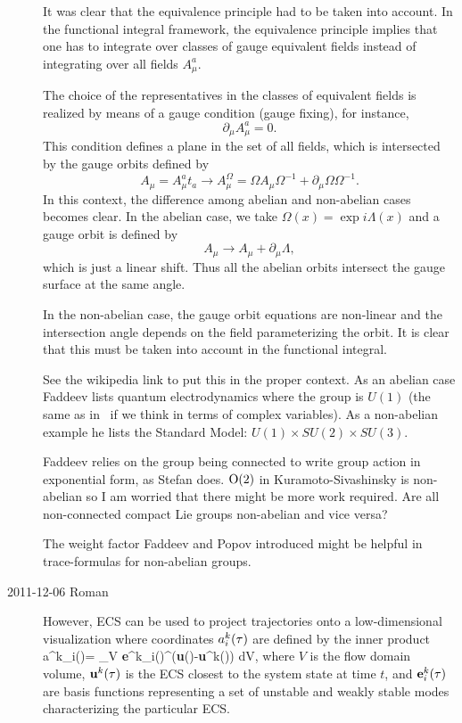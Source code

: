 \begin{description}
\begin{ttfamily}
It was clear that the equivalence principle had to be taken into account.
In the functional integral framework, the equivalence principle implies
that one has to integrate over classes of gauge equivalent fields instead
of integrating over all fields $A_\mu^a$.

The choice of the representatives in the classes of equivalent fields is
realized by means of a gauge condition (gauge fixing), for instance,
\[
    \partial_{\mu} A_{\mu}^{a} = 0 .
\]
This condition defines a plane in the set of all fields, which is
intersected by the gauge orbits defined by
\[
    A_{\mu} = A_{\mu}^{a}t_{a} \to A_{\mu}^{\Omega}
            = \Omega A_{\mu} \Omega^{-1} + \partial_{\mu} \Omega \Omega^{-1} .
\]
In this context, the difference among abelian and non-abelian cases
becomes clear. In the abelian case, we take $\Omega(x) =
\exp{i\Lambda(x)}$ and a gauge orbit is defined by
\[
    A_{\mu} \to A_{\mu} + \partial_{\mu} \Lambda ,
\]
which is just a linear shift. Thus all the abelian orbits intersect the
gauge surface at the same angle.

In the non-abelian case, the gauge orbit equations are non-linear and the
intersection angle depends on the field parameterizing the orbit. It is
clear that this must be taken into account in the functional integral.
\end{ttfamily}

See the wikipedia link to put this in the proper context. As an abelian
case Faddeev lists quantum electrodynamics where the group is $U(1)$ (the
same as in \cLe\ if we think in terms of complex variables). As a
non-abelian example he lists the Standard Model: $U(1)\times SU(2) \times
SU(3)$.

Faddeev relies on the group being connected to write group action in
exponential form, as Stefan does. $\textrm{O}(2)$ in Kuramoto-Sivashinsky is
non-abelian so I am worried that there might be more work required. Are
all non-connected compact Lie groups non-abelian and vice versa?

The weight factor Faddeev and Popov introduced might be helpful in
trace-formulas for non-abelian groups.

\item[2011-12-06 Roman] However,  ECS can be used to project
trajectories onto a low-dimensional visualization where coordinates $a^k_{i}(\tau)$
are defined by the inner product
\beq
\label{coordinatesRG}
a^k_{i}(\zeit)=  \int_V {\bf e}^k_i(\zeit)^\dagger\cdot({\bf u}(\zeit)-{\bf u}^k(\zeit)) dV,
\eeq
where $V$ is the flow domain volume, ${\bf u}^k(\tau)$ is the ECS closest to
the system state at time $t$, and ${\bf e}^k_i(\tau)$ are basis functions
representing a set of unstable and weakly stable modes characterizing the
particular ECS.


\end{description}
